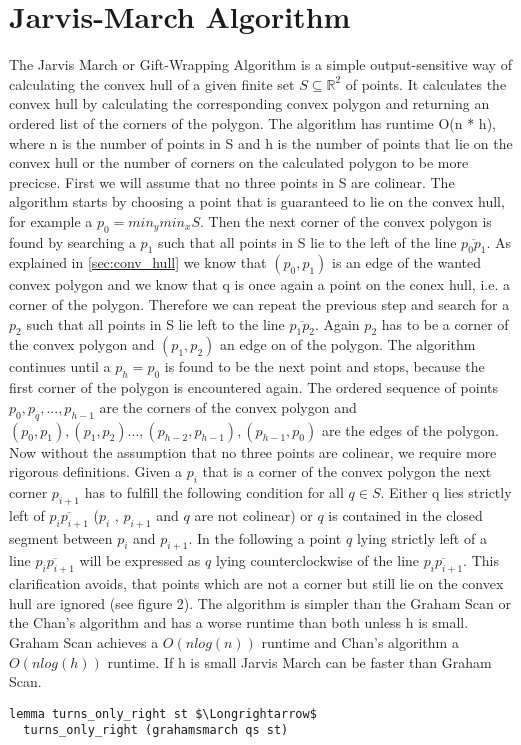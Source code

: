 

\section{Jarvis-March Algorithm}
The Jarvis March or Gift-Wrapping Algorithm is a simple output-sensitive way of calculating
the convex hull of a given finite set $S \subseteq \mathbb{R}^2$ of points. It calculates the
convex hull by calculating the corresponding convex polygon and returning
an ordered list of the corners of the polygon. The algorithm has runtime O(n * h), where n 
is the number of points in S and h is the number of points that lie on the convex hull or
the number of corners on the calculated polygon to be more precicse. 
First we will assume that no three points in S are colinear.
The algorithm starts by choosing a point that is guaranteed to lie on the convex hull, 
for example a $p_0 = min_y min_x S$. Then the next corner of the convex polygon
is found by searching a $p_1$ such that all points in S lie to the left of the 
line $\overline{p_0 p_1}$. As explained in \ref{sec:conv_hull} we know that $(p_0,p_1)$ is 
an edge of the wanted convex polygon and we know that q is once again a point on
the conex hull, i.e. a corner of the polygon. Therefore we can repeat the previous step
and search for a $p_2$ such that all points in S lie left to the line $\overline{p_1 p_2}$.
Again $p_2$ has to be a corner of the convex polygon and $(p_1,p_2)$ an edge on of the
polygon. The algorithm continues until a $p_h = p_0$ is found to be the next point and
stops, because the first corner of the polygon is encountered again. 
The ordered sequence of points $p_0,p_q, ... , p_{h-1}$ are the corners of the convex polygon 
and $(p_0,p_1),(p_1,p_2) ... ,(p_{h-2},p_{h-1}), (p_{h-1},p_0)$ are the edges of the polygon.
Now without the assumption that no three points are colinear, we require more rigorous definitions.
Given a $p_i$ that is a corner of the convex polygon the next corner $p_{i+1}$ 
has to fulfill the following condition for all $q \in S$.
Either q lies strictly left of $\overline{p_i p_{i+1}}$ ($p_i$
, $p_{i+1}$ and $q$ are not colinear) or $q$ is contained in the closed
segment between $p_i$ and $p_{i+1}$. In the following  a point $q$ lying strictly
left of a line $\overline{p_i p_{i+1}}$ will be expressed as $q$ lying
counterclockwise of the line $\overline{p_i p_{i+1}}$. This clarification avoids, that
points which are not a corner but still lie on the convex hull are ignored (see figure 2).    
The algorithm is simpler than the Graham Scan or the Chan's algorithm and has a worse
runtime than both unless h is small. Graham Scan achieves a $O(n log(n))$ runtime and 
Chan's algorithm a $O(n log(h))$ runtime. If h is small Jarvis March 
can be faster than Graham Scan.
\begin{lstlisting}[language=isabelle]
  lemma turns_only_right st $\Longrightarrow$
  turns_only_right (grahamsmarch qs st)
\end{lstlisting}
  

